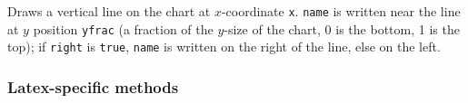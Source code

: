 \begin{tabb}
Draws a vertical line on the chart at $x$-coordinate \texttt{x}.
\texttt{name} is written near the line at $y$ position \texttt{yfrac}
(a fraction of the $y$-size of the chart, 0 is the bottom, 1 is the top);
if \texttt{right} is \texttt{true}, \texttt{name} is written on the right
of the line, else on the left.
\end{tabb}
\begin{htmlonly}
\end{htmlonly}



\subsubsection*{Latex-specific methods}

